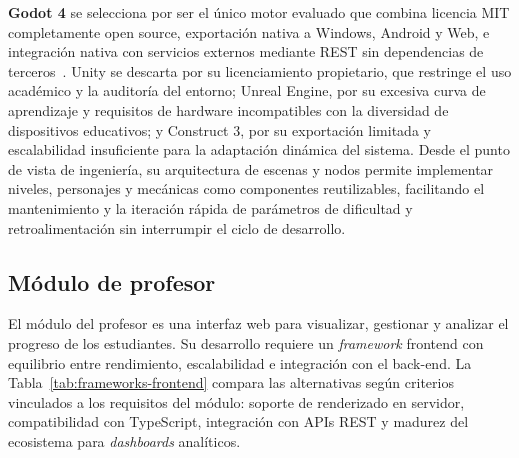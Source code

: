 \textbf{Godot 4} se selecciona por ser el único motor evaluado que combina licencia MIT completamente open source, exportación nativa a Windows, Android y Web, e integración nativa con servicios externos mediante REST sin dependencias de terceros~\cite{godot}. Unity se descarta por su licenciamiento propietario, que restringe el uso académico y la auditoría del entorno; Unreal Engine, por su excesiva curva de aprendizaje y requisitos de hardware incompatibles con la diversidad de dispositivos educativos; y Construct 3, por su exportación limitada y escalabilidad insuficiente para la adaptación dinámica del sistema. Desde el punto de vista de ingeniería, su arquitectura de escenas y nodos permite implementar niveles, personajes y mecánicas como componentes reutilizables, facilitando el mantenimiento y la iteración rápida de parámetros de dificultad y retroalimentación sin interrumpir el ciclo de desarrollo.

\subsection{Módulo de profesor}

El módulo del profesor es una interfaz web para visualizar, gestionar y analizar el progreso de los estudiantes. Su desarrollo requiere un \textit{framework} frontend con equilibrio entre rendimiento, escalabilidad e integración con el back-end. La Tabla~\ref{tab:frameworks-frontend} compara las alternativas según criterios vinculados a los requisitos del módulo: soporte de renderizado en servidor, compatibilidad con TypeScript, integración con APIs REST y madurez del ecosistema para \textit{dashboards} analíticos.

